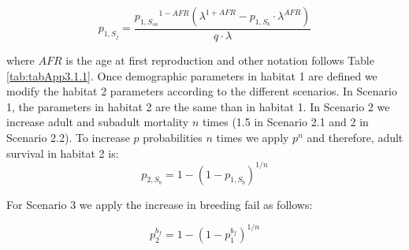 \begin{equation*}
{p}_{1, {S}_{j}} = \frac {{{p}_{1, {S}_{sa}}} ^ {1-AFR} \left({\lambda}^{1+AFR}
- {p}_{1, {S}_{b}} \cdot {\lambda} ^ {AFR} \right)} {q \cdot \lambda}
\end{equation*}

where $AFR$ is the age at first reproduction and other notation follows Table
\ref{tab:tabApp3.1.1}. Once demographic parameters in habitat 1 are defined we
modify the habitat 2 parameters according to the different scenarios. In
Scenario 1, the parameters in habitat 2 are the same than in habitat 1. In
Scenario 2 we increase adult and subadult mortality $n$ times (1.5 in Scenario
2.1 and 2 in Scenario 2.2). To increase $p$ probabilities $n$ times we apply
$p^{n}$ and therefore, adult survival in habitat 2 is:
\begin{equation*}
{p}_{2, {S}_{b}} =1- {\left(1- {p}_{1, {S}_{b}} \right)}^{{1} / {n}}
\end{equation*}

For Scenario 3 we apply the increase in breeding fail as follows:

\begin{equation*}
{p}_{2}^{{b}_{f}} =1- {\left(1- {p}_{1}^{{b}_{f}} \right)}^{{1} / {n}}
\end{equation*}

\clearpage


